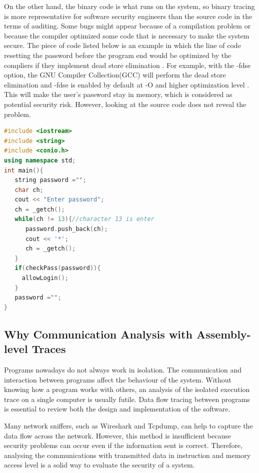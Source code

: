 On the other hand, the binary code is what runs on the system, so binary tracing is more representative for software security engineers than the source code in the terms of auditing. Some bugs might appear because of a compilation problem or because the compiler optimized some code that is necessary to make the system secure. The piece of code listed below is an example in which the line of code resetting the password before the program end would be optimized by the compliers if they implement  dead store elimination \cite{howard2003writing}. For example, with the -fdse option, the GNU Compiler Collection(GCC) will perform the dead store elimination and -fdse is enabled by default at -O and higher optimization level \cite{gcc}. This will make the user's password stay in memory, which is considered as potential security risk. However, looking at the source code does not reveal the problem.

\begin{lstlisting}[language=C++, caption= Password fetching example ]
#include <iostream>
#include <string>
#include <conio.h>
using namespace std;
int main(){
   string password ="";
   char ch;
   cout << "Enter password";
   ch = _getch();
   while(ch != 13){//character 13 is enter
      password.push_back(ch);
      cout << '*';
      ch = _getch();
   }   
   if(checkPass(password)){
     allowLogin();
   }  
   password ="";
}
\end{lstlisting}

\subsection{Why Communication Analysis with Assembly-level Traces}
Programs nowadays do not always work in isolation. The communication and interaction between programs affect the behaviour of the system. Without knowing how a program works with others, an analysis of the isolated execution trace on a single computer is usually futile. Data flow tracing between programs is essential to review both the design and implementation of the software.

Many network sniffers, such as Wireshark\cite{_wireshark_????} and Tcpdump\cite{tcpdump_tcpdump/libpcap_????}, can help to capture the data flow across the network. However, this method  is insufficient because security problems can occur even if the information sent is correct. Therefore, analysing the communications with transmitted data in instruction and memory access level is a solid way to evaluate the security of a system.

